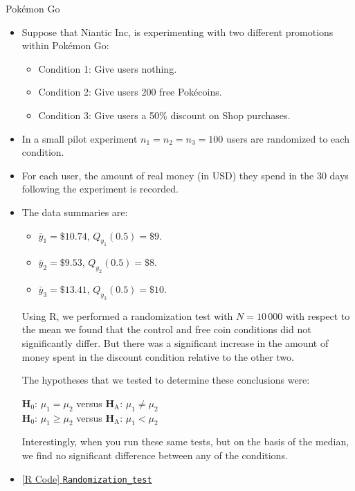 \begin{Example}{Pokémon Go}{}
      \begin{itemize}
            \item Suppose that Niantic Inc, is experimenting with two different promotions within Pokémon
                  Go:
                  \begin{itemize}
                        \item Condition 1: Give users nothing.
                        \item Condition 2: Give users 200 free Pokécoins.
                        \item Condition 3: Give users a 50\% discount on Shop purchases.
                  \end{itemize}
            \item In a small pilot experiment $ n_1=n_2=n_3=100 $ users are randomized to each condition.
            \item For each user, the amount of real money (in USD) they spend in the 30 days following
                  the experiment is recorded.
            \item The data summaries are:
                  \begin{itemize}
                        \item $ \bar{y}_1=\$10.74 $, $ Q_{y_1}(0.5)=\$9 $.
                        \item $ \bar{y}_2=\$9.53 $, $ Q_{y_2}(0.5)=\$8 $.
                        \item $ \bar{y}_3=\$13.41 $, $ Q_{y_3}(0.5)=\$10 $.
                  \end{itemize}
                  Using R, we performed a randomization test with $ N=10\,000 $ with respect to the mean
                  we found that the control and free coin conditions did not significantly differ.
                  But there was a significant increase in the amount of money spent in the discount condition
                  relative to the other two.

                  \vspace{2mm}

                  The hypotheses that we tested to determine these conclusions were:
                  \begin{tightcenter}
                        $ \mathbf{H}_0 $: $ \mu_1=\mu_2 $ versus $ \mathbf{H}_\text{A} $: $ \mu_1\ne \mu_2 $\\
                        $ \mathbf{H}_0 $: $ \mu_1\ge \mu_2 $ versus $ \mathbf{H}_\text{A} $: $ \mu_1<\mu_2 $
                  \end{tightcenter}
                  Interestingly, when you run these same tests, but on the basis of the median, we find
                  no significant difference between any of the conditions.
            \item \href{https://github.com/Hextical/university-notes/blob/master/year-3/semester-3/STAT 430/code/Randomization_test.R}{[R Code] \texttt{Randomization\_test}}
      \end{itemize}
\end{Example}
